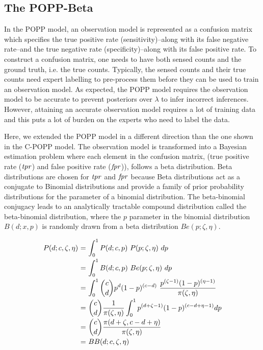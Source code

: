 \subsection{The POPP-Beta}
\label{subsec:popb}

In the POPP model, an observation model is represented as a confusion matrix which specifies the true positive rate (sensitivity)--along with its false negative rate--and the true negative rate (specificity)--along with its false positive rate. To construct a confusion matrix, one needs to have both sensed counts and the ground truth, i.e. the true counts. Typically, the sensed counts and their true counts need expert labelling to pre-process them before they can be used to train an observation model. As expected, the POPP model requires the observation model to be accurate to prevent posteriors over $\lambda$ to infer incorrect inferences. However, attaining an accurate observation model requires a lot of training data and this puts a lot of burden on the experts who need to label the data.   

Here, we extended the POPP model in a different direction than the one shown in the C-POPP model. The observation model is transformed into a Bayesian estimation problem where each element in the confusion matrix, (true positive rate ($\textrm{\textit{tpr}}$) and false positive rate ($\textrm{\textit{fpr}}$)), follows a beta distribution. Beta distributions are chosen for $\textrm{\textit{tpr}}$ and $\textrm{\textit{fpr}}$ because Beta distributions act as a conjugate to Binomial distributions and provide a family of prior probability distributions for the parameter of a binomial distribution. The beta-binomial conjugacy leads to an analytically tractable compound distribution called the beta-binomial distribution, where the $p$ parameter in the binomial distribution $B(d ; x, p)$ is randomly drawn from a beta distribution $Be(p ; \zeta, \eta)$.

\begin{equation}
	\label{eq:beta_binomial}
	\begin{tabular}{r@{ = }l}
		$P(d ; c, \zeta, \eta)$ & $\displaystyle\int_{0}^{1} P(d ; c, p) ~ P(p ; \zeta, \eta) ~dp$ \\ [2ex]
		& $\displaystyle\int_{0}^{1} B(d ; c, p) ~ Be(p ; \zeta, \eta) ~dp$ \\ [2ex]
        & $\displaystyle\int_{0}^{1} \binom{c}{d} p^d (1-p)^{(c-d)} ~ \displaystyle\frac{p^{(\zeta - 1)} (1-p)^{(\eta-1)}}{\pi(\zeta, \eta)}$ \\ [2ex]
        & $\displaystyle\binom cd \displaystyle\frac{1}{\pi(\zeta, \eta)} \displaystyle\int_{0}^{1} p^{(d+\zeta-1)} (1-p)^{(c-d+\eta-1)} dp$ \\ [2ex]
        & $\displaystyle\binom cd \displaystyle\frac{\pi(d+\zeta, c-d+\eta)}{\pi(\zeta, \eta)}$ \\ [2ex]
        & $BB(d ; c, \zeta, \eta)$
	\end{tabular}
\end{equation}

